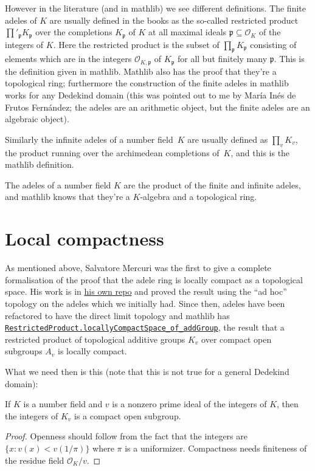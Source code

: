 However in the literature (and in mathlib) we see different definitions.
The finite adeles of $K$ are usually defined in the books
as the so-called restricted product $\prod'_{\mathfrak{p}}K_{\mathfrak{p}}$ over the completions
$K_{\mathfrak{p}}$ of $K$ at all maximal ideals $\mathfrak{p}\subseteq\mathcal{O}_K$ of the
integers of $K$. Here the restricted product is the subset of $\prod_{\mathfrak{p}}K_{\mathfrak{p}}$
consisting of elements which are in the integers $\mathcal{O}_{K,\mathfrak{p}}$ of
$K_{\mathfrak{p}}$ for all but finitely many $\mathfrak{p}$. This is the definition given in
mathlib. Mathlib also has the proof that they're a topological ring;
furthermore the construction of the finite adeles in mathlib works for any
Dedekind domain (this was pointed out to me by Mar\'ia In\'es
de Frutos Fern\'andez; the adeles
are an arithmetic object, but the finite adeles are an algebraic object).

Similarly the infinite adeles of a number field~$K$
are usually defined as $\prod_v K_v$,
the product running over the archimedean completions of~$K$, and this is
the mathlib definition.

The adeles of a number field $K$ are the product of the finite and infinite
adeles, and mathlib knows that they're a $K$-algebra and a topological ring.

\section{Local compactness}

As mentioned above, Salvatore Mercuri was the first to give a complete formalisation of the proof
that the adele ring is locally compact as a topological space. His work is in
\href{https://github.com/smmercuri/adele-ring_locally-compact}{his own repo} and proved the
result using the ``ad hoc'' topology on the adeles which we initially had. Since then,
adeles have been refactored to have the direct limit topology and mathlib has
\href{https://leanprover-community.github.io/mathlib4_docs/Mathlib/Topology/Algebra/RestrictedProduct.html\#RestrictedProduct.locallyCompactSpace_of_addGroup}
{\tt RestrictedProduct.locallyCompactSpace\_of\_addGroup}, the result
that a restricted product of topological additive groups $K_v$ over compact open
subgroups $A_v$ is locally compact.

What we need then is this (note that this is not true for a general Dedekind domain):
\begin{theorem}
  \label{needsformalizing1}
  If $K$ is a number field and $v$ is a nonzero prime ideal of the integers of $K$,
  then the integers of $K_v$ is a compact open subgroup.
\end{theorem}
\begin{proof} Openness should follow from the fact that the integers are
  $\{x : v(x)<v(1/\pi)\}$ where $\pi$ is a uniformizer. Compactness needs
  finiteness of the residue field $\mathcal{O}_K/v$.
\end{proof}


